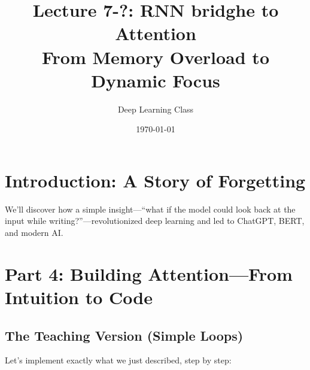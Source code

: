 \documentclass{article}
\title{Lecture 7-?: RNN bridghe to Attention\\From Memory Overload to Dynamic Focus}
\author{Deep Learning Class}
\date{\today}
\begin{document}
\maketitle

\section{Introduction: A Story of Forgetting}

\begin{tcolorbox}[colback=blue!5!white, colframe=blue!50!black, title=Today's Journey]
We'll discover how a simple insight---``what if the model could look back at the input while writing?''---revolutionized deep learning and led to ChatGPT, BERT, and modern AI.
\end{tcolorbox}



















\section{Part 4: Building Attention---From Intuition to Code}

\subsection{The Teaching Version (Simple Loops)}

Let's implement exactly what we just described, step by step:
\end{document}
